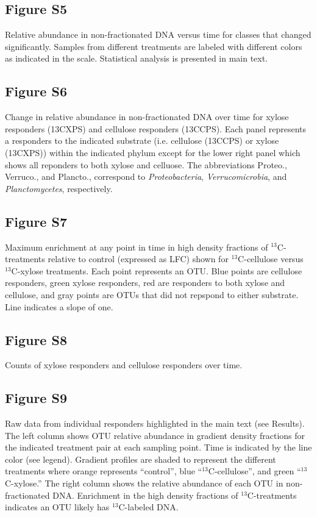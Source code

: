 \subsection{Figure S5}
Relative abundance in non-fractionated DNA versus time for classes that changed significantly.
Samples from different treatments are labeled with different colors as
indicated in the scale. Statistical analysis is presented in main text.

\subsection{Figure S6}
Change in relative abundance in non-fractionated DNA over time for xylose
responders (13CXPS) and cellulose responders (13CCPS). Each panel represents
a responders to the indicated substrate (i.e. cellulose (13CCPS) or xylose (13CXPS)) 
within the indicated phylum except for the lower right panel which shows all reponders to both
xylose and celluose. The abbreviations Proteo., Verruco., and Plancto.,
correspond to \textit{Proteobacteria}, \textit{Verrucomicrobia}, and \textit{Planctomycetes},
respectively.

\subsection{Figure S7}
Maximum enrichment at any point in time in high density fractions
of $^{13}$C-treatments relative to control (expressed as LFC) shown
for $^{13}$C-cellulose versus $^{13}$C-xylose treatments. Each point
represents an OTU. Blue points are cellulose responders, green xylose
responders, red are responders to both xylose and cellulose, and gray points
are OTUs that did not repspond to either substrate. Line indicates a slope of
one. 

\subsection{Figure S8}
Counts of xylose responders and cellulose responders over time. \subsection{Figure S9}
Raw data from individual responders highlighted in the main text (see
Results). The left column shows OTU relative abundance in gradient density
fractions for the indicated treatment pair at each sampling point. Time is
indicated by the line color (see legend). Gradient profiles are shaded
to represent the different treatments where orange represents ``control'',
blue ``$^{13}$C-cellulose'', and green ``$^{13}$C-xylose.'' The right column
shows the relative abundance of each OTU in non-fractionated DNA. Enrichment in the
high density fractions of $^{13}$C-treatments indicates an OTU likely
has $^{13}$C-labeled DNA. 

